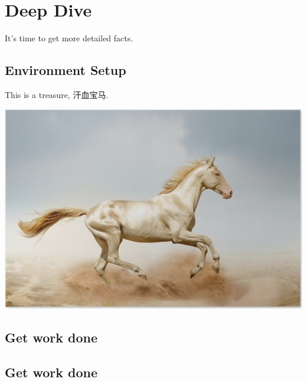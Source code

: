 

\chapter{Deep Dive}
\minitoc

It's time to get more detailed facts.

\section{Environment Setup}

This is a treasure, 汗血宝马.

\includegraphics[scale=3]{chapter2/akhal_teke_horse}

\blindtext[3]

\section{Get work done}

\blindtext[3]

\section{Get work done}

\blindtext[3]
